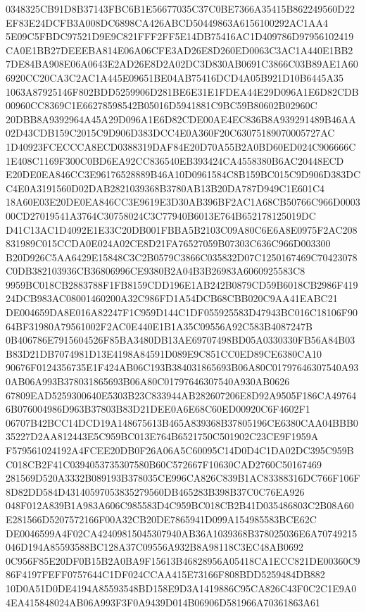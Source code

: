 \documentclass[UTF8,fontset=fandol,zihao=-4,a4paper]{ctexart}
\begin{document}
{{0348325CB91D8B37143FBC6B1E56677035C37C0BE7366A35415B862249560D22EF83E24DCFB3A008DC6898CA426ABCD50449863A6156100292AC1AA4
5E09C5FBDC97521D9E9C821FFF2FF5E14DB75416AC1D409786D97956102419CA0E1BB27DEEEBA814E06A06CFE3AD26E8D260ED0063C3AC1A440E1BB2
7DE84BA908E06A0643E2AD26E8D2A02DC3D830AB0691C3866C03B89AE1A606920CC20CA3C2AC1A445E09651BE04AB75416DCD4A05B921D10B6445A35
1063A87925146F802BDD5259906D281BE6E31E1FDEA44E29D096A1E6D82CDB00960CC8369C1E66278598542B05016D5941881C9BC59B80602B02960C
20DBB8A9392964A45A29D096A1E6D82CDE00AE4EC836B8A939291489B46AA02D43CDB159C2015C9D906D383DCC4E0A360F20C63075189070005727AC
1D40923FCECCCA8ECD0388319DAF84E20D70A55B2A0BD60ED024C906666C1E408C1169F300C0BD6EA92CC836540EB393424CA4558380B6AC20448ECD
E20DE0EA846CC3E96176528889B46A10D0961584C8B159BC015C9D906D383DCC4E0A3191560D02DAB2821039368B3780AB13B20DA787D949C1E601C4
18A60E03E20DE0EA846CC3E9619E3D30AB396BF2AC1A68CB50766C966D000300CD27019541A3764C30758024C3C77940B6013E764B652178125019DC
D41C13AC1D4092E1E33C20DB001FBBA5B2103C09A80C6E6A8E0975F2AC208831989C015CCDA0E024A02CE8D21FA76527059B07303C636C966D003300
B20D926C5AA6429E15848C3C2B0579C3866C035832D07C1250167469C70423078C0DB382103936CB36806996CE9380B2A04B3B26983A6060925583C8
9959BC018CB2883788F1FB8159CDD196E1AB242B0879CD59B6018CB2986F41924DCB983AC08001460200A32C986FD1A54DCB68CBB020C9AA41EABC21
DE004659DA8E016A82247F1C959D144C1DF055925583D47943BC016C18106F9064BF31980A79561002F2AC0E440E1B1A35C09556A92C583B4087247B
0B406786E7915604526F85BA3480DB13AE69707498BD05A0330330FB56A84B03B83D21DB7074981D13E4198A84591D089E9C851CC0ED89CE6380CA10
90676F0124356735E1F424AB06C193B384031865693B06A80C01797646307540A930AB06A993B378031865693B06A80C01797646307540A930AB0626
67809EAD5259300640E5303B23C833944AB282607206E8D92A9505F186CA497646B076004986D963B37803B83D21DEE0A6E68C60ED00920C6F4602F1
06707B42BCC14DCD19A148675613B465A839368B37805196CE6380CAA04BBB035227D2AA812443E5C959BC013E764B6521750C501902C23CE9F1959A
F579561024192A4FCEE20DB0F26A06A5C60095C14D0D4C1DA02DC395C959BC018CB2F41C0394053735307580B60C572667F10630CAD2760C50167469
281569D520A3332B089193B378035CE996CA826C839B1AC83388316DC766F106F8D82DD584D43140597053835279560DB465283B398B37C0C76EA926
048F012A839B1A983A606C985583D4C959BC018CB2B41D035486803C2B08A60E281566D5207572166F00A32CB20DE7865941D099A154985583BCE62C
DE0046599A4F02CA42409815045307940AB36A1039368B378025036E6A70749215046D194A85593588BC128A37C09556A932B8A98118C3EC48AB0692
0C956F85E20DF0B15B2A0BA9F15613B46828956A05418CA1ECC821DE00360C986F4197FEFF0757644C1DF024CCAA415E73166F808BDD5259484DB882
10D0A51D0DE4194A85593548BD158E9D3A1419886C95CA826C43F0C2C1E9A04EA415848024AB06A993F3F0A9439D014B06906D581966A70361863A61
}}
\end{document}
